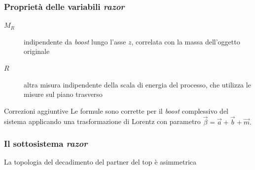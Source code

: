\documentclass[italian]{beamer}
\begin{document}
\begin{frame}
    \frametitle{Propriet\`a delle variabili \emph{razor}}
    \begin{description}
        \item[$M_R$] indipendente da \emph{boost} lungo l'asse $z$,
            correlata con la massa dell'oggetto originale
        \item[$R$] altra misura indipendente della scala di energia del
            processo, che utilizza le misure sul piano trasverso
    \end{description}

    \begin{block}
        {Correzioni aggiuntive}
        Le formule sono corrette per il \emph{boost} complessivo del sistema applicando
        una trasformazione di Lorentz con parametro $\vec{\beta} = \vec{a} + \vec{b} +
        \vec{m}.$
    \end{block}
\end{frame}

\begin{frame}
    \frametitle{Il sottosistema \emph{razor}}
    \alert{La topologia del decadimento del partner del top \`e asimmetrica}

\end{frame}
\end{document}

